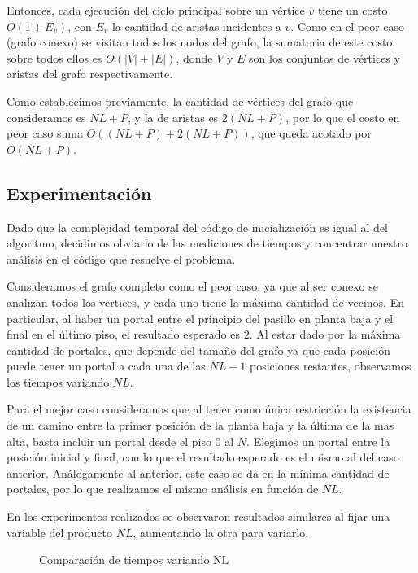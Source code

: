 Entonces, cada ejecución del ciclo principal sobre un vértice $v$ tiene un costo $O(1 + E_v)$, con $E_v$ la cantidad de aristas incidentes a $v$. Como en el peor caso (grafo conexo) se visitan todos los nodos del grafo, la sumatoria de este costo sobre todos ellos es $O(|V| + |E|)$, donde $V$ y $E$ son los conjuntos de vértices y aristas del grafo respectivamente. 

Como establecimos previamente, la cantidad de vértices del grafo que consideramos es $NL + P$, y la de aristas es $2 (NL + P)$, por lo que el costo en peor caso suma $O((NL + P) + 2(NL + P))$, que queda acotado por $O( NL + P )$.

\subsection{Experimentación}

Dado que la complejidad temporal del código de inicialización es igual al del algoritmo, decidimos obviarlo de las mediciones de tiempos y concentrar nuestro análisis en el código que resuelve el problema.

Consideramos el grafo completo como el peor caso, ya que al ser conexo se analizan todos los vertices, y cada uno tiene la máxima cantidad de vecinos. En particular, al haber un portal entre el principio del pasillo en planta baja y el final en el último piso, el resultado esperado es $2$.
Al estar dado por la máxima cantidad de portales, que depende del tamaño del grafo ya que cada posición puede tener un portal a cada una de las $NL - 1$ posiciones restantes, observamos los tiempos variando $NL$.

Para el mejor caso consideramos que al tener como única restricción la existencia de un camino entre la primer posición de la planta baja y la última de la mas alta, basta incluir un portal desde el piso $0$ al $N$. Elegimos un portal entre la posición inicial y final, con lo que el resultado esperado es el mismo al del caso anterior.
Análogamente al anterior, este caso se da en la mínima cantidad de portales, por lo que realizamos el mismo análisis en función de $NL$.

En los experimentos realizados se observaron resultados similares al fijar una variable del producto $NL$, aumentando la otra para variarlo.

\begin{figure}[H]

\caption{Comparación de tiempos variando NL}
\end{figure}

